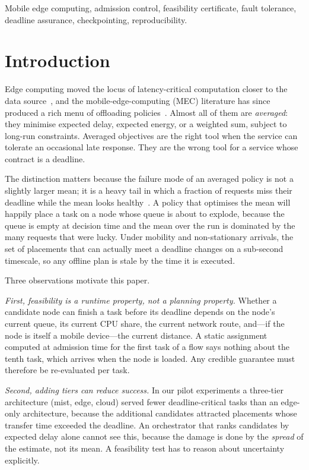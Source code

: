 \documentclass[journal,10pt]{IEEEtran}
\begin{document}
\begin{IEEEkeywords}
Mobile edge computing, admission control, feasibility certificate, fault
tolerance, deadline assurance, checkpointing, reproducibility.
\end{IEEEkeywords}

\section{Introduction}
\label{sec:intro}

Edge computing moved the locus of latency-critical computation closer to the
data source~\cite{satyanarayanan2017,shi2016edge}, and the mobile-edge-computing
(MEC) literature has since produced a rich menu of offloading
policies~\cite{mao2017survey,mach2017survey,chen2015game}. Almost all of them
are \emph{averaged}: they minimise expected delay, expected energy, or a
weighted sum, subject to long-run constraints. Averaged objectives are the
right tool when the service can tolerate an occasional late response. They are
the wrong tool for a service whose contract is a deadline.

The distinction matters because the failure mode of an averaged policy is not
a slightly larger mean; it is a heavy tail in which a fraction of requests miss
their deadline while the mean looks healthy~\cite{dean2013tail}. A policy that
optimises the mean will happily place a task on a node whose queue is about to
explode, because the queue is empty at decision time and the mean over the run
is dominated by the many requests that were lucky. Under mobility and
non-stationary arrivals, the set of placements that can actually meet a
deadline changes on a sub-second timescale, so any offline plan is stale by the
time it is executed.

Three observations motivate this paper.

\emph{First, feasibility is a runtime property, not a planning property.}
Whether a candidate node can finish a task before its deadline depends on the
node's current queue, its current CPU share, the current network route, and---if
the node is itself a mobile device---the current distance. A static assignment
computed at admission time for the first task of a flow says nothing about the
tenth task, which arrives when the node is loaded. Any credible guarantee must
therefore be re-evaluated per task.

\emph{Second, adding tiers can reduce success.} In our pilot experiments a
three-tier architecture (mist, edge, cloud) served fewer deadline-critical
tasks than an edge-only architecture, because the additional candidates
attracted placements whose transfer time exceeded the deadline. An orchestrator
that ranks candidates by expected delay alone cannot see this, because the
damage is done by the \emph{spread} of the estimate, not its mean. A feasibility
test has to reason about uncertainty explicitly.
\end{document}
